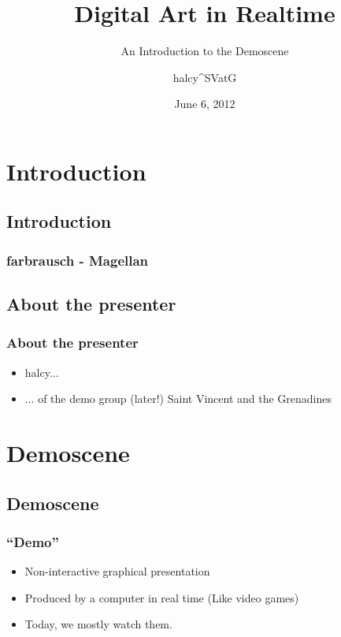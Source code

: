 \documentclass[t,14pt,aspectratio=169]{beamer}
\title{Digital Art in Realtime}
\subtitle{An Introduction to the Demoscene}
\author{halcy{\textasciicircum}SVatG}
\begin{document}

\date{June 6, 2012}

\begin{frame}
\titlepage
\end{frame}


\section{Introduction}
\subsection{Introduction}

\begin{frame}
\frametitle{farbrausch - Magellan}
\end{frame}

\subsection{About the presenter}
\begin{frame}
\frametitle{About the presenter}
\begin{itemize}
\item halcy...
\item ... of the demo group (later!) Saint Vincent and the Grenadines
\end{itemize}
\end{frame}

\section{Demoscene}
\subsection{Demoscene}

\begin{frame}
\frametitle{``Demo''}
\begin{itemize}
\item Non-interactive graphical presentation
\item Produced by a computer in real time (Like video games)
\item Today, we mostly watch them.
\end{itemize}
\end{frame}
\end{document}
